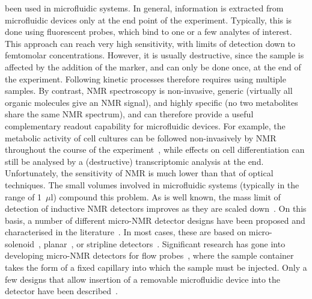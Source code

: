 \documentclass[preprint,5p]{elsarticle}
\begin{document}
been used in microfluidic systems. In general, information is extracted from
microfluidic devices only at the end point of the experiment. Typically, this is
done using fluorescent probes, which bind to one or a few analytes of interest.
This approach can reach very high sensitivity, with limits of detection down to
femtomolar concentrations. However, it is usually destructive, since the sample
is affected by the addition of the marker, and can only be done once, at the end
of the experiment. Following kinetic processes therefore requires using multiple
samples. By contrast, NMR spectroscopy is non-invasive, generic (virtually all
organic molecules give an NMR signal), and highly specific (no two metabolites
share the same NMR spectrum), and can therefore provide a useful complementary
readout capability for microfluidic devices. For example, the metabolic activity
of cell cultures can be followed non-invasively by NMR throughout the course of
the experiment~\cite{cellnmr-2015}, while effects on cell differentiation can
still be analysed by a (destructive) transcriptomic analysis at the end.
Unfortunately, the sensitivity of NMR is much lower than that of optical
techniques. The small volumes involved in microfluidic systems (typically in the
range of 1~$\mu$l) compound this problem. As is well known, the mass limit of
detection of inductive NMR detectors improves as they are scaled
down~\cite{Olson1995}. On this basis, a number of different micro-NMR detector
designs have been proposed and characterised in the
literature~\cite{utz2012review,micronmr2014review}. In most cases, these are
based on micro-solenoid~\cite{SUBRAMANIAN1998,Pines2007},
planar~\cite{Maguire2007,dieter2008,EHRMANN200}, or stripline
detectors~\cite{stripline_jan}. Significant research has gone into developing
micro-NMR detectors for flow probes\cbstart~\cite{bas-shim,Montinaro-2018,chen2017high,oosthoek2017continuous,bart2009microfluidic,bart2009optimization,massin2003planar}\cbend, where the sample container takes the form
of a fixed capillary into which the sample must be injected. Only a few designs
that allow insertion of a removable microfluidic device into the detector have \cbstart
been described~\cite{Spengler-2014,Spengler-2016,gream_2016,swyer2019digital}. \cbend
\end{document}
